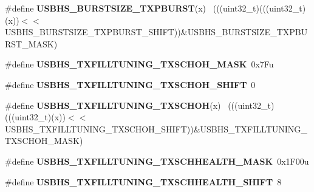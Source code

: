 \begin{DoxyCompactItemize}
\item 
\hypertarget{group___u_s_b_h_s___register___masks_ga3f29aab8917d4b02524ddcf5faa6c80d}{}\#define {\bfseries U\+S\+B\+H\+S\+\_\+\+B\+U\+R\+S\+T\+S\+I\+Z\+E\+\_\+\+T\+X\+P\+B\+U\+R\+S\+T}(x)                        ~(((uint32\+\_\+t)(((uint32\+\_\+t)(x))$<$$<$U\+S\+B\+H\+S\+\_\+\+B\+U\+R\+S\+T\+S\+I\+Z\+E\+\_\+\+T\+X\+P\+B\+U\+R\+S\+T\+\_\+\+S\+H\+I\+F\+T))\&U\+S\+B\+H\+S\+\_\+\+B\+U\+R\+S\+T\+S\+I\+Z\+E\+\_\+\+T\+X\+P\+B\+U\+R\+S\+T\+\_\+\+M\+A\+S\+K)\label{group___u_s_b_h_s___register___masks_ga3f29aab8917d4b02524ddcf5faa6c80d}

\item 
\hypertarget{group___u_s_b_h_s___register___masks_gae08800e420807adaf9863460259798a3}{}\#define {\bfseries U\+S\+B\+H\+S\+\_\+\+T\+X\+F\+I\+L\+L\+T\+U\+N\+I\+N\+G\+\_\+\+T\+X\+S\+C\+H\+O\+H\+\_\+\+M\+A\+S\+K}~0x7\+Fu\label{group___u_s_b_h_s___register___masks_gae08800e420807adaf9863460259798a3}

\item 
\hypertarget{group___u_s_b_h_s___register___masks_ga18f2d8666048580044829768b9195288}{}\#define {\bfseries U\+S\+B\+H\+S\+\_\+\+T\+X\+F\+I\+L\+L\+T\+U\+N\+I\+N\+G\+\_\+\+T\+X\+S\+C\+H\+O\+H\+\_\+\+S\+H\+I\+F\+T}~0\label{group___u_s_b_h_s___register___masks_ga18f2d8666048580044829768b9195288}

\item 
\hypertarget{group___u_s_b_h_s___register___masks_ga99c24b428334522ce57d9b470936c390}{}\#define {\bfseries U\+S\+B\+H\+S\+\_\+\+T\+X\+F\+I\+L\+L\+T\+U\+N\+I\+N\+G\+\_\+\+T\+X\+S\+C\+H\+O\+H}(x)                    ~(((uint32\+\_\+t)(((uint32\+\_\+t)(x))$<$$<$U\+S\+B\+H\+S\+\_\+\+T\+X\+F\+I\+L\+L\+T\+U\+N\+I\+N\+G\+\_\+\+T\+X\+S\+C\+H\+O\+H\+\_\+\+S\+H\+I\+F\+T))\&U\+S\+B\+H\+S\+\_\+\+T\+X\+F\+I\+L\+L\+T\+U\+N\+I\+N\+G\+\_\+\+T\+X\+S\+C\+H\+O\+H\+\_\+\+M\+A\+S\+K)\label{group___u_s_b_h_s___register___masks_ga99c24b428334522ce57d9b470936c390}

\item 
\hypertarget{group___u_s_b_h_s___register___masks_ga88abe76a4eddaa2891e1f115c4c929f4}{}\#define {\bfseries U\+S\+B\+H\+S\+\_\+\+T\+X\+F\+I\+L\+L\+T\+U\+N\+I\+N\+G\+\_\+\+T\+X\+S\+C\+H\+H\+E\+A\+L\+T\+H\+\_\+\+M\+A\+S\+K}~0x1\+F00u\label{group___u_s_b_h_s___register___masks_ga88abe76a4eddaa2891e1f115c4c929f4}

\item 
\hypertarget{group___u_s_b_h_s___register___masks_ga0770830775ebd5659d5833fc34a017ad}{}\#define {\bfseries U\+S\+B\+H\+S\+\_\+\+T\+X\+F\+I\+L\+L\+T\+U\+N\+I\+N\+G\+\_\+\+T\+X\+S\+C\+H\+H\+E\+A\+L\+T\+H\+\_\+\+S\+H\+I\+F\+T}~8\label{group___u_s_b_h_s___register___masks_ga0770830775ebd5659d5833fc34a017ad}


\end{DoxyCompactItemize}
